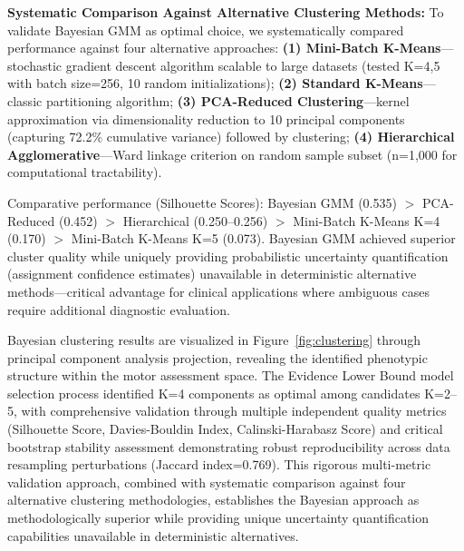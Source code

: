 \documentclass[11pt]{article}
\begin{document}
\textbf{Systematic Comparison Against Alternative Clustering Methods:} To validate Bayesian GMM as optimal choice, we systematically compared performance against four alternative approaches: \textbf{(1) Mini-Batch K-Means}—stochastic gradient descent algorithm scalable to large datasets (tested K=4,5 with batch size=256, 10 random initializations); \textbf{(2) Standard K-Means}—classic partitioning algorithm; \textbf{(3) PCA-Reduced Clustering}—kernel approximation via dimensionality reduction to 10 principal components (capturing 72.2\% cumulative variance) followed by clustering; \textbf{(4) Hierarchical Agglomerative}—Ward linkage criterion on random sample subset (n=1,000 for computational tractability).

Comparative performance (Silhouette Scores): Bayesian GMM (0.535) $>$ PCA-Reduced (0.452) $>$ Hierarchical (0.250--0.256) $>$ Mini-Batch K-Means K=4 (0.170) $>$ Mini-Batch K-Means K=5 (0.073). Bayesian GMM achieved superior cluster quality while uniquely providing probabilistic uncertainty quantification (assignment confidence estimates) unavailable in deterministic alternative methods—critical advantage for clinical applications where ambiguous cases require additional diagnostic evaluation.

Bayesian clustering results are visualized in Figure~\ref{fig:clustering} through principal component analysis projection, revealing the identified phenotypic structure within the motor assessment space. The Evidence Lower Bound model selection process identified K=4 components as optimal among candidates K=2--5, with comprehensive validation through multiple independent quality metrics (Silhouette Score, Davies-Bouldin Index, Calinski-Harabasz Score) and critical bootstrap stability assessment demonstrating robust reproducibility across data resampling perturbations (Jaccard index=0.769). This rigorous multi-metric validation approach, combined with systematic comparison against four alternative clustering methodologies, establishes the Bayesian approach as methodologically superior while providing unique uncertainty quantification capabilities unavailable in deterministic alternatives.
\end{document}
